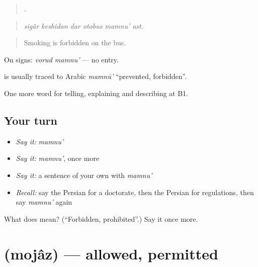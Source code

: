 \begin{quote}
     .
\end{quote}

\begin{quote}
\emph{sigâr keshidan dar otobus mamnu' ast.}
\end{quote}

\begin{quote}
Smoking is forbidden on the bus.
\end{quote}

On signs: \emph{vorud mamnu'} — no entry.

\begin{cousinweb}
\textbf{} is usually traced to Arabic \emph{mamnū'} \textquotedblleft{}prevented, forbidden\textquotedblright{}.
\end{cousinweb}

\begin{grammarlens}[title={What you've built}]
One more word for telling, explaining and describing at B1.
\end{grammarlens}

\subsection*{Your turn}
\begin{itemize}
\raggedright
  \item \emph{Say it:} \emph{mamnu'}
  \item \emph{Say it:} \emph{mamnu'}, once more
  \item \emph{Say it:} a sentence of your own with \emph{mamnu'}
  \item \emph{Recall:} say the Persian for a doctorate, then the Persian for regulations, then say \emph{mamnu'} again
\end{itemize}

\begin{tcolorbox}[breakable,colback=teal!4,colframe=teal!35!black,title={Before you move on}]
What does  mean? (\textquotedblleft{}Forbidden, prohibited\textquotedblright{}.) Say it once more.
\end{tcolorbox}
\section[\texorpdfstring{\fa{مجاز} (mojâz)}{مجاز (mojâz)}]{ (mojâz) — allowed, permitted}

\label{lesson:FA-C404-mojaz}



